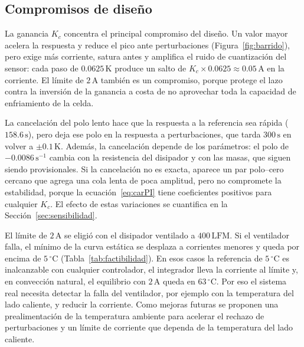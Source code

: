 \subsection{Compromisos de diseño}\label{sec:compromisos}
La ganancia $K_c$ concentra el principal compromiso del diseño. Un valor mayor acelera la respuesta y reduce el pico ante perturbaciones (Figura~\ref{fig:barrido}), pero exige más corriente, satura antes y amplifica el ruido de cuantización del sensor: cada paso de $0.0625\,\mathrm K$ produce un salto de $K_c\times0.0625\approx0.05\,\mathrm A$ en la corriente. El límite de $2\,\mathrm A$ también es un compromiso, porque protege el lazo contra la inversión de la ganancia a costa de no aprovechar toda la capacidad de enfriamiento de la celda.

La cancelación del polo lento hace que la respuesta a la referencia sea rápida ($158.6\,\mathrm s$), pero deja ese polo en la respuesta a perturbaciones, que tarda $300\,\mathrm s$ en volver a $\pm0.1\,\mathrm K$. Además, la cancelación depende de los parámetros: el polo de $-0.0086\,\mathrm{s^{-1}}$ cambia con la resistencia del disipador y con las masas, que siguen siendo provisionales. Si la cancelación no es exacta, aparece un par polo--cero cercano que agrega una cola lenta de poca amplitud, pero no compromete la estabilidad, porque la ecuación~\eqref{eq:carPI} tiene coeficientes positivos para cualquier $K_c$. El efecto de estas variaciones se cuantifica en la Sección~\ref{sec:sensibilidad}.

El límite de $2\,\mathrm A$ se eligió con el disipador ventilado a $400\,\mathrm{LFM}$. Si el ventilador falla, el mínimo de la curva estática se desplaza a corrientes menores y queda por encima de $5\,^\circ\mathrm C$ (Tabla~\ref{tab:factibilidad}). En esos casos la referencia de $5\,^\circ\mathrm C$ es inalcanzable con cualquier controlador, el integrador lleva la corriente al límite y, en convección natural, el equilibrio con $2\,\mathrm A$ queda en $63\,^\circ\mathrm C$. Por eso el sistema real necesita detectar la falla del ventilador, por ejemplo con la temperatura del lado caliente, y reducir la corriente. Como mejoras futuras se proponen una prealimentación de la temperatura ambiente para acelerar el rechazo de perturbaciones y un límite de corriente que dependa de la temperatura del lado caliente.
